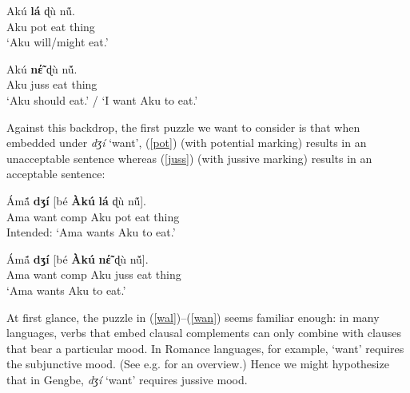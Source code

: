 \documentclass[output=paper
,modfonts
,nonflat]{langsci/langscibook}
\newcommand{\Z}{ʒ}
\newcommand{\D}{ɖ}
\newcommand{\á}{\'{ã}}
\newcommand{\É}{\'{\~{ε}}}
\newcommand{\È}{\`{\~{ε}}}
\newcommand{\í}{\'{\~{i}}}
\newcommand{\ì}{\`{\~{i}}}
\newcommand{\Ó}{\'{\~{ɔ}}}
\newcommand{\Ò}{\`{\~{ɔ}}}
\newcommand{\ú}{\'{ũ}}
\newcommand{\ù}{\`{ũ}}
\begin{document}
\ea 
\gll Ak\'u {\bf l\'a} {\D}\`u n\'{\~u}.\\
Aku {\sc pot} eat thing\\
\glt `Aku will/might eat.' \label{pot} %
\z

\ea
\gll Ak\'u {\bf n{\É}} {\D}\`u n\'{\~u}.\\
Aku {\sc juss} eat thing\\
\glt`Aku should eat.' / `I want Aku to eat.' \label{juss} %
\z

Against this backdrop, the first puzzle we want to consider is that when embedded under {\em d{\Z}\'i} `want', (\ref{pot}) (with potential marking) results in an unacceptable sentence whereas (\ref{juss}) (with jussive marking) results in an acceptable sentence:

\ea
\gll *\'Am\'{\~a} {\bf d{\Z}\'i} [b\'e {\bf \`Ak\'u} {\bf l\'a} {\D}\`u n\'{\~u}].\\
Ama want {\sc comp} Aku {\sc pot} eat thing\\
\glt Intended: `Ama wants Aku to eat.' \label{wal} %
\z

\ea
\gll \'Am\'{\~a} {\bf d{\Z}\'i} [b\'e {\bf \`Ak\'u} {\bf n{\É}} {\D}\`u n\'{\~u}].\\
Ama want {\sc comp} Aku {\sc juss} eat thing\\
\glt `Ama wants Aku to eat.' \label{wan}  %
\z

At first glance, the puzzle in (\ref{wal})--(\ref{wan}) seems familiar enough: in many languages, verbs that embed clausal complements can only combine with clauses that bear a particular mood. In Romance languages, for example, `want' requires the subjunctive mood. (See e.g. \citealt{palmer01} for an overview.) Hence we might hypothesize that in Gengbe, {\em d{\Z}\'i} `want' requires jussive mood. 
\end{document}
